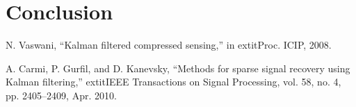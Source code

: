 \documentclass[12pt]{article}
\begin{document}
\section{Conclusion}


\begin{thebibliography}{1}
N. Vaswani, ``Kalman filtered compressed sensing,'' in 	extit{Proc. ICIP}, 2008.

A. Carmi, P. Gurfil, and D. Kanevsky, ``Methods for sparse signal recovery using Kalman filtering,'' 	extit{IEEE Transactions on Signal Processing}, vol. 58, no. 4, pp. 2405--2409, Apr. 2010.
\end{thebibliography}
\end{document}
